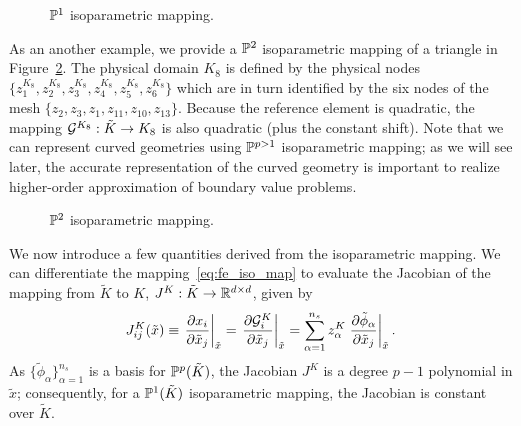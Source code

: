 \begin{figure}
  \centering
  \caption{$\mathbb{P}^1$ isoparametric mapping. \label{fig:fe_impl_isomap_p1}}
\end{figure}

As an another example, we provide a $\mathbb{P}^2$ isoparametric mapping of a triangle in Figure~\ref{fig:fe_impl_isomap_p2}. The physical domain $K_8$ is defined by the physical nodes $\{ z_1^{K_8}, z_2^{K_8}, z_3^{K_8}, z_4^{K_8}, z_5^{K_8}, z_6^{K_8} \}$ which are in turn identified by the six nodes of the mesh $\{ z_2, z_3, z_1, z_{11}, z_{10}, z_{13} \}$.  Because the reference element is quadratic, the mapping $\mathcal{G}^{K_8}: \tilde K \to K_8$ is also quadratic (plus the constant shift).  Note that we can represent curved geometries using $\mathbb{P}^{p>1}$ isoparametric mapping; as we will see later, the accurate representation of the curved geometry is important to realize higher-order approximation of boundary value problems. 

\begin{figure}
  \centering
  \caption{$\mathbb{P}^2$ isoparametric mapping. \label{fig:fe_impl_isomap_p2}}
\end{figure}

We now introduce a few quantities derived from the isoparametric mapping.  We can differentiate the mapping~\eqref{eq:fe_iso_map} to evaluate the Jacobian of the mapping from $\tilde K$ to $K$, $J^K: \tilde K \to \mathbb{R}^{d \times d}$, given by
\begin{equation*}
  J^K_{ij}(\tilde x)
  \equiv \left. \frac{\partial x_i}{\partial \tilde x_j} \right|_{\tilde x}
  = \left. \frac{\partial \mathcal{G}^K_i}{\partial \tilde x_j} \right|_{\tilde x}
  = \sum_{\alpha= 1}^{n_s} z^K_\alpha \left. \frac{\partial \tilde \phi_\alpha}{\partial \tilde x_j} \right|_{\tilde x}.
\end{equation*}
As $\{\tilde \phi_\alpha\}_{\alpha=1}^{n_s}$ is a basis for $\mathbb{P}^p(\tilde K)$, the Jacobian $J^K$ is a degree $p-1$ polynomial in $\tilde x$; consequently, for a $\mathbb{P}^1(\tilde K)$ isoparametric mapping, the Jacobian is constant over $\tilde K$.

